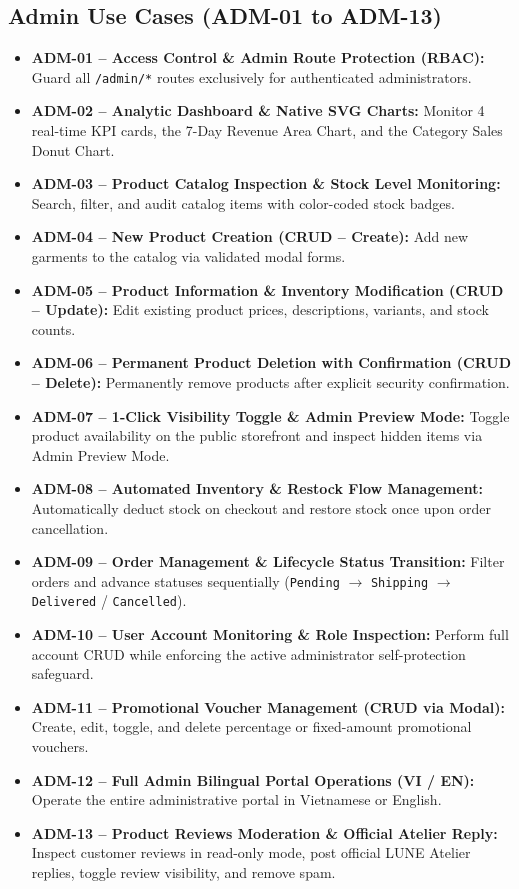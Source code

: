 \documentclass[12pt,a4paper,oneside]{report}
\begin{document}
\subsection{Admin Use Cases (ADM-01 to ADM-13)}
\begin{itemize}[leftmargin=1.2cm]
    \item \textbf{ADM-01 -- Access Control \& Admin Route Protection (RBAC):} Guard all \texttt{/admin/*} routes exclusively for authenticated administrators.
    \item \textbf{ADM-02 -- Analytic Dashboard \& Native SVG Charts:} Monitor 4 real-time KPI cards, the 7-Day Revenue Area Chart, and the Category Sales Donut Chart.
    \item \textbf{ADM-03 -- Product Catalog Inspection \& Stock Level Monitoring:} Search, filter, and audit catalog items with color-coded stock badges.
    \item \textbf{ADM-04 -- New Product Creation (CRUD -- Create):} Add new garments to the catalog via validated modal forms.
    \item \textbf{ADM-05 -- Product Information \& Inventory Modification (CRUD -- Update):} Edit existing product prices, descriptions, variants, and stock counts.
    \item \textbf{ADM-06 -- Permanent Product Deletion with Confirmation (CRUD -- Delete):} Permanently remove products after explicit security confirmation.
    \item \textbf{ADM-07 -- 1-Click Visibility Toggle \& Admin Preview Mode:} Toggle product availability on the public storefront and inspect hidden items via Admin Preview Mode.
    \item \textbf{ADM-08 -- Automated Inventory \& Restock Flow Management:} Automatically deduct stock on checkout and restore stock once upon order cancellation.
    \item \textbf{ADM-09 -- Order Management \& Lifecycle Status Transition:} Filter orders and advance statuses sequentially (\texttt{Pending} $\rightarrow$ \texttt{Shipping} $\rightarrow$ \texttt{Delivered} / \texttt{Cancelled}).
    \item \textbf{ADM-10 -- User Account Monitoring \& Role Inspection:} Perform full account CRUD while enforcing the active administrator self-protection safeguard.
    \item \textbf{ADM-11 -- Promotional Voucher Management (CRUD via Modal):} Create, edit, toggle, and delete percentage or fixed-amount promotional vouchers.
    \item \textbf{ADM-12 -- Full Admin Bilingual Portal Operations (VI / EN):} Operate the entire administrative portal in Vietnamese or English.
    \item \textbf{ADM-13 -- Product Reviews Moderation \& Official Atelier Reply:} Inspect customer reviews in read-only mode, post official LUNE Atelier replies, toggle review visibility, and remove spam.
\end{itemize}
\end{document}
